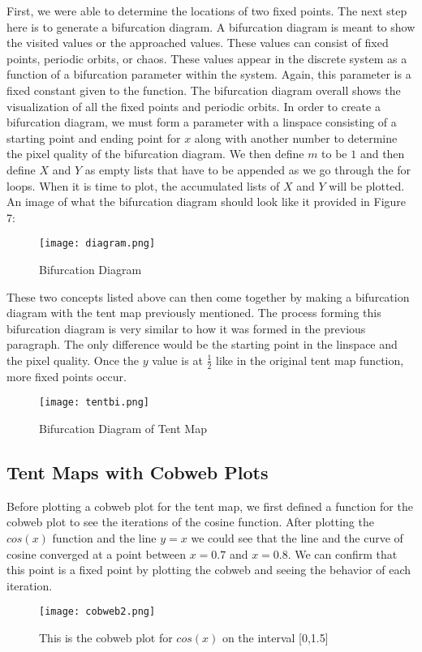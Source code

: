 \documentclass{article}
\begin{document}
First, we were able to determine the locations of two fixed points. The next step here is to generate a bifurcation diagram. A bifurcation diagram is meant to show the visited values or the approached values. These values can consist of fixed points, periodic orbits, or chaos. These values appear in the discrete system as a function of a bifurcation parameter within the system. Again, this parameter is a fixed constant given to the function. The bifurcation diagram overall shows the visualization of all the fixed points and periodic orbits. \cite{boeing2018pynamical} In order to create a bifurcation diagram, we must form a parameter with a linspace consisting of a starting point and ending point for $x$ along with another number to determine the pixel quality of the bifurcation diagram. We then define $m$ to be $1$ and then define $X$ and $Y$ as empty lists that have to be appended as we go through the for loops. When it is time to plot, the accumulated lists of $X$ and $Y$ will be plotted. An image of what the bifurcation diagram should look like it provided in Figure 7:
\begin{figure}[htp]
    \centering
    \texttt{[image: diagram.png]}
    \caption{Bifurcation Diagram}
    \label{fig:Bifurcation Diagram}
\end{figure}

These two concepts listed above can then come together by making a bifurcation diagram with the tent map previously mentioned. The process forming this bifurcation diagram is very similar to how it was formed in the previous paragraph. The only difference would be the starting point in the linspace and the pixel quality. Once the $y$ value is at $\frac{1}{2}$ like in the original tent map function, more fixed points occur.
\begin{figure}[htp]
    \centering
    \texttt{[image: tentbi.png]}
    \caption{Bifurcation Diagram of Tent Map}
    \label{fig:Bifurcation Diagram of Tent Map}
\end{figure}

\subsection{Tent Maps with Cobweb Plots}
Before plotting a cobweb plot for the tent map, we first defined a function for the cobweb plot to see the iterations of the cosine function. After plotting the $cos(x)$ function and the line $y=x$ we could see that the line and the curve of cosine converged at a point between $x=0.7$ and $x=0.8$. We can confirm that this point is a fixed point by plotting the cobweb and seeing the behavior of each iteration.
\begin{figure}[htp]
    \centering
    \texttt{[image: cobweb2.png]}
    \caption{This is the cobweb plot for $cos(x)$ on the interval [0,1.5]}
    \label{fig:Cobweb}
\end{figure}
\end{document}
